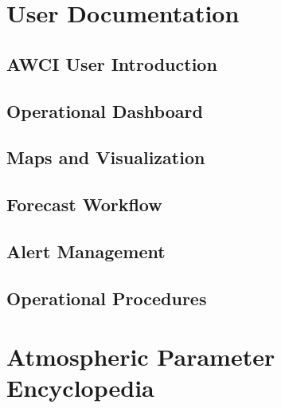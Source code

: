\documentclass[11pt,a4paper,oneside]{report}
\begin{document}

\part{User Documentation}


\chapter{AWCI User Introduction}




\chapter{Operational Dashboard}




\chapter{Maps and Visualization}




\chapter{Forecast Workflow}




\chapter{Alert Management}




\chapter{Operational Procedures}




\part{Atmospheric Parameter Encyclopedia}
\end{document}
